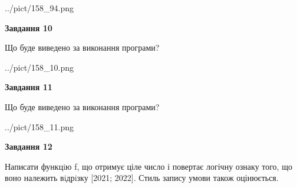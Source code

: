 \documentclass[12pt, ukrainian]{article}
\begin{document}
{\begin {large}
\begin{center}
	{../pict/158_94.png}
\end{center}
\newpage

{\begin {center}\textbf{Завдання 10}\end {center}}

Що буде виведено за виконання програми?\par
\begin{center}
	{../pict/158_10.png}
\end{center}
\newpage

{\begin {center}\textbf{Завдання 11}\end {center}}

Що буде виведено за виконання програми?\par
\begin{center}
	{../pict/158_11.png}
\end{center}
\newpage

{\begin {center}\textbf{Завдання 12}\end {center}}


Написати функцiю f, що отримує ціле число і повертає логічну ознаку того, що воно належить вiдрiзку [2021; 2022]. Стиль запису умови також оцінюється.\par
\newpage

\end {large}}
\end{document}
